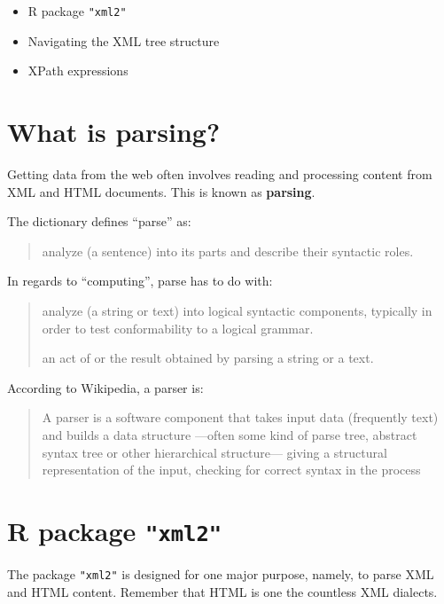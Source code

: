 \documentclass[
]{book}
\begin{document}
\begin{itemize}
\item
  R package \texttt{"xml2"}
\item
  Navigating the XML tree structure
\item
  XPath expressions
\end{itemize}

\hypertarget{what-is-parsing}{%
\section{What is parsing?}\label{what-is-parsing}}

Getting data from the web often involves reading and processing content from
XML and HTML documents. This is known as \textbf{parsing}.

The dictionary defines ``parse'' as:

\begin{quote}
analyze (a sentence) into its parts and describe their syntactic roles.
\end{quote}

In regards to ``computing'', parse has to do with:

\begin{quote}
analyze (a string or text) into logical syntactic components, typically in
order to test conformability to a logical grammar.

an act of or the result obtained by parsing a string or a text.
\end{quote}

According to Wikipedia, a parser is:

\begin{quote}
A parser is a software component that takes input data (frequently text) and
builds a data structure ---often some kind of parse tree, abstract syntax
tree or other hierarchical structure--- giving a structural representation of
the input, checking for correct syntax in the process
\end{quote}

\hypertarget{r-package-xml2}{%
\section{\texorpdfstring{R package \texttt{"xml2"}}{R package "xml2"}}\label{r-package-xml2}}

The package \texttt{"xml2"} is designed for one major purpose, namely, to parse
XML and HTML content. Remember that HTML is one the countless XML dialects.
\end{document}
